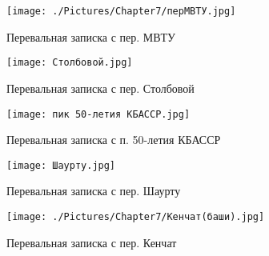     \begin{figure}[ht]
        \begin{center}
            \begin{minipage}[h]{0.5\linewidth}\label{fig:pass_notes_mvtu}
                \texttt{[image: ./Pictures/Chapter7/перМВТУ.jpg]}
                \caption{Перевальная записка с пер. МВТУ}
            \end{minipage}%
            \begin{minipage}[h]{0.5\linewidth}\label{fig:pass_notes_stolbovoy}
                \texttt{[image: Столбовой.jpg]}
                \caption{Перевальная записка с пер. Столбовой}
            \end{minipage}
        \end{center}
    \end{figure}

    \begin{figure}[ht]\label{fig:pass_notes_kbassr}
        \centering
        \texttt{[image: пик 50-летия КБАССР.jpg]}
        \caption{Перевальная записка с п. 50-летия КБАССР}
    \end{figure}





    \begin{figure}[ht]
        \begin{center}
            \begin{minipage}[h]{0.5\linewidth}\label{fig:pass_notes_shaurtu}
                \texttt{[image: Шаурту.jpg]}
                \caption{Перевальная записка с пер. Шаурту}
            \end{minipage}%
            \begin{minipage}[h]{0.5\linewidth}\label{fig:pass_notes_kenchat}
                \texttt{[image: ./Pictures/Chapter7/Кенчат(баши).jpg]}
                \caption{Перевальная записка с пер. Кенчат}
            \end{minipage}
        \end{center}
    \end{figure}

